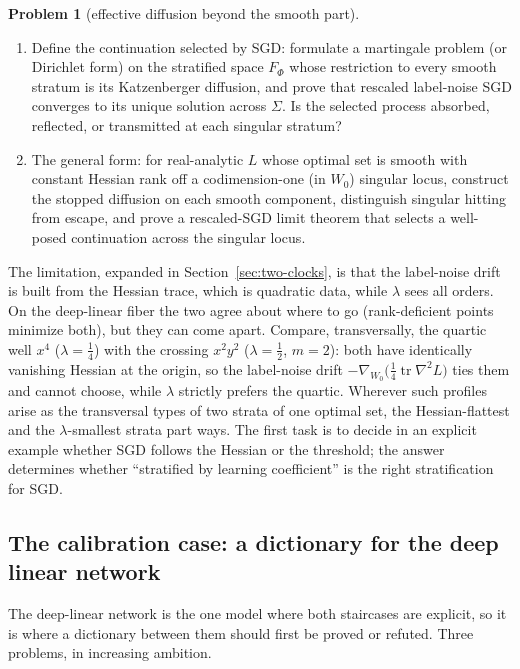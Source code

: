 \documentclass[11pt]{amsart}
\theoremstyle{plain}
\theoremstyle{definition}
\newtheorem{problem}[theorem]{Problem}
\newcommand{\tr}{\operatorname{tr}}
\begin{document}
\begin{problem}[effective diffusion beyond the smooth part]
\begin{enumerate}
\item[(b)] Define the continuation selected by SGD: formulate a martingale problem (or Dirichlet form) on the stratified space $F_\Phi$ whose restriction to every smooth stratum is its Katzenberger diffusion, and prove that rescaled label-noise SGD converges to its unique solution across $\Sigma$. Is the selected process absorbed, reflected, or transmitted at each singular stratum?
\item[(c)] The general form: for real-analytic $L$ whose optimal set is smooth with constant Hessian rank off a codimension-one (in $W_0$) singular locus, construct the stopped diffusion on each smooth component, distinguish singular hitting from escape, and prove a rescaled-SGD limit theorem that selects a well-posed continuation across the singular locus.
\end{enumerate}
\end{problem}

The limitation, expanded in Section~\ref{sec:two-clocks}, is that the label-noise drift is built from the Hessian trace, which is quadratic data, while $\lambda$ sees all orders. On the deep-linear fiber the two agree about where to go (rank-deficient points minimize both), but they can come apart. Compare, transversally, the quartic well $x^4$ ($\lambda = \tfrac14$) with the crossing $x^2 y^2$ ($\lambda = \tfrac12$, $m = 2$): both have identically vanishing Hessian at the origin, so the label-noise drift $-\nabla_{W_0}\bigl(\tfrac14 \tr \nabla^2 L\bigr)$ ties them and cannot choose, while $\lambda$ strictly prefers the quartic. Wherever such profiles arise as the transversal types of two strata of one optimal set, the Hessian-flattest and the $\lambda$-smallest strata part ways. The first task is to decide in an explicit example whether SGD follows the Hessian or the threshold; the answer determines whether ``stratified by learning coefficient'' is the right stratification for SGD.

\subsection{The calibration case: a dictionary for the deep linear network}\label{sec:dictionary}

The deep-linear network is the one model where both staircases are explicit, so it is where a dictionary between them should first be proved or refuted. Three problems, in increasing ambition.
\end{document}
